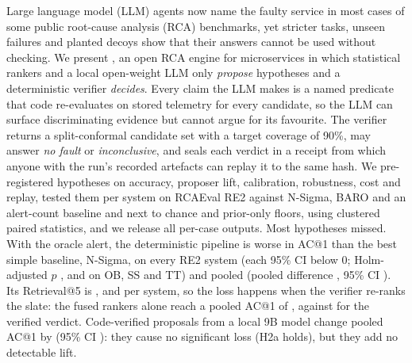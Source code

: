 Large language model (LLM) agents now name the faulty service in most cases of some public root-cause analysis (RCA) benchmarks, yet stricter tasks, unseen failures and planted decoys show that their answers cannot be used without checking.
We present \sys, an open RCA engine for microservices in which statistical rankers and a local open-weight LLM only \emph{propose} hypotheses and a deterministic verifier \emph{decides}.
Every claim the LLM makes is a named predicate that code re-evaluates on stored telemetry for every candidate, so the LLM can surface discriminating evidence but cannot argue for its favourite.
The verifier returns a split-conformal candidate set with a target coverage of 90\%, may answer \emph{no fault} or \emph{inconclusive}, and seals each verdict in a receipt from which anyone with the run's recorded artefacts can replay it to the same hash.
We pre-registered hypotheses on accuracy, proposer lift, calibration, robustness, cost and replay, tested them per system on RCAEval RE2 against N-Sigma, BARO and an alert-count baseline and next to chance and prior-only floors, using clustered paired statistics, and we release all per-case outputs.
Most hypotheses missed.
With the oracle alert, the deterministic pipeline is worse in AC@1 than the best simple baseline, N-Sigma, on every RE2 system (each 95\% CI below 0; Holm-adjusted $p$ ,  and  on OB, SS and TT) and pooled (pooled difference , 95\% CI ).
Its Retrieval@5 is ,  and  per system, so the loss happens when the verifier re-ranks the slate: the fused rankers alone reach a pooled AC@1 of , against  for the verified verdict.
Code-verified proposals from a local 9B model change pooled AC@1 by  (95\% CI ): they cause no significant loss (H2a holds), but they add no detectable lift.
